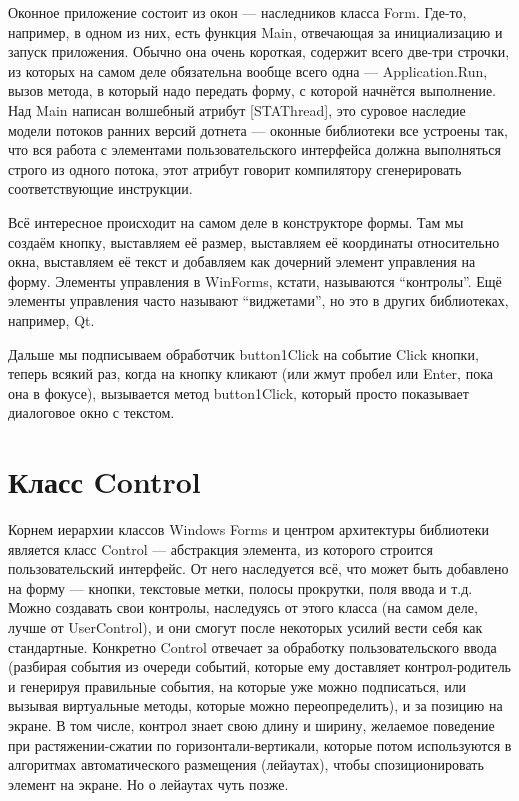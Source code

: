 \documentclass[a5paper]{article}
\begin{document}
Оконное приложение состоит из окон --- наследников класса Form. Где-то, например, в одном из них, есть функция Main, отвечающая за инициализацию и запуск приложения. Обычно она очень короткая, содержит всего две-три строчки, из которых на самом деле обязательна вообще всего одна --- Application.Run, вызов метода, в который надо передать форму, с которой начнётся выполнение. Над Main написан волшебный атрибут [STAThread], это суровое наследие модели потоков ранних версий дотнета --- оконные библиотеки все устроены так, что вся работа с элементами пользовательского интерфейса должна выполняться строго из одного потока, этот атрибут говорит компилятору сгенерировать соответствующие инструкции.

Всё интересное происходит на самом деле в конструкторе формы. Там мы создаём кнопку, выставляем её размер, выставляем её координаты относительно окна, выставляем её текст и добавляем как дочерний элемент управления на форму. Элементы управления в WinForms, кстати, называются ``контролы''. Ещё элементы управления часто называют ``виджетами'', но это в других библиотеках, например, Qt. 

Дальше мы подписываем обработчик button1Click на событие Click кнопки, теперь всякий раз, когда на кнопку кликают (или жмут пробел или Enter, пока она в фокусе), вызывается метод button1Click, который просто показывает диалоговое окно с текстом.

\section{Класс Control}

Корнем  иерархии классов Windows Forms и центром архитектуры библиотеки является класс Control --- абстракция элемента, из которого строится пользовательский интерфейс. От него наследуется всё, что может быть добавлено на форму --- кнопки, текстовые метки, полосы прокрутки, поля ввода и т.д. Можно создавать свои контролы, наследуясь от этого класса (на самом деле, лучше от UserControl), и они смогут после некоторых усилий вести себя как стандартные. Конкретно Control отвечает за обработку пользовательского ввода (разбирая события из очереди событий, которые ему доставляет контрол-родитель и генерируя правильные события, на которые уже можно подписаться, или вызывая виртуальные методы, которые можно переопределить), и за позицию на экране. В том числе, контрол знает свою длину и ширину, желаемое поведение при растяжении-сжатии по горизонтали-вертикали, которые потом используются в алгоритмах автоматического размещения (лейаутах), чтобы спозиционировать элемент на экране. Но о лейаутах чуть позже.
\end{document}
